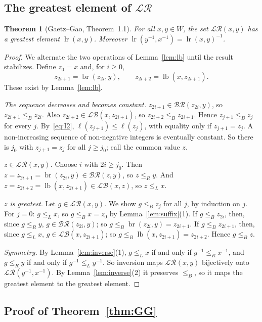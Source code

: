 \documentclass[11pt]{amsart}
\newtheorem{theorem}{Theorem}[section]
\theoremstyle{definition}
\theoremstyle{remark}
\numberwithin{equation}{section}
\newcommand{\LB}{\mathcal{LB}}
\newcommand{\BR}{\mathcal{BR}}
\newcommand{\LR}{\mathcal{LR}}
\newcommand{\leR}{\le_R}
\newcommand{\leL}{\le_L}
\newcommand{\leB}{\le_B}
\DeclareMathOperator{\lb}{lb}
\DeclareMathOperator{\br}{br}
\DeclareMathOperator{\lr}{lr}
\begin{document}
\subsection{The greatest element of \texorpdfstring{\(\LR\)}{LR}}

\begin{theorem}[Gaetz--Gao, Theorem~1.1]\label{thm:lr}
For all \(x,y\in W\), the set \(\LR(x,y)\) has a greatest element \(\lr(x,y)\). Moreover \(\lr(y^{-1},x^{-1})=\lr(x,y)^{-1}\).
\end{theorem}

\begin{proof}
We alternate the two operations of Lemma~\ref{lem:lb} until the result stabilizes. Define \(z_0=x\) and, for \(i\ge0\),
\[
z_{2i+1}=\br(z_{2i},y),\qquad z_{2i+2}=\lb(x,z_{2i+1}).
\]
These exist by Lemma~\ref{lem:lb}.

\emph{The sequence decreases and becomes constant.} \(z_{2i+1}\in\BR(z_{2i},y)\), so \(z_{2i+1}\leB z_{2i}\). Also \(z_{2i+2}\in\LB(x,z_{2i+1})\), so \(z_{2i+2}\leB z_{2i+1}\). Hence \(z_{j+1}\leB z_j\) for every \(j\). By~\eqref{eq:I2}, \(\ell(z_{j+1})\le\ell(z_j)\), with equality only if \(z_{j+1}=z_j\). A non-increasing sequence of non-negative integers is eventually constant. So there is \(j_0\) with \(z_{j+1}=z_j\) for all \(j\ge j_0\); call the common value \(z\).

\emph{\(z\in\LR(x,y)\).} Choose \(i\) with \(2i\ge j_0\). Then \(z=z_{2i+1}=\br(z_{2i},y)\in\BR(z,y)\), so \(z\leR y\). And \(z=z_{2i+2}=\lb(x,z_{2i+1})\in\LB(x,z)\), so \(z\leL x\).

\emph{\(z\) is greatest.} Let \(g\in\LR(x,y)\). We show \(g\leB z_j\) for all \(j\), by induction on \(j\). For \(j=0\): \(g\leL x\), so \(g\leB x=z_0\) by Lemma~\ref{lem:suffix}(1). If \(g\leB z_{2i}\), then, since \(g\leR y\), \(g\in\BR(z_{2i},y)\); so \(g\leB\br(z_{2i},y)=z_{2i+1}\). If \(g\leB z_{2i+1}\), then, since \(g\leL x\), \(g\in\LB(x,z_{2i+1})\); so \(g\leB\lb(x,z_{2i+1})=z_{2i+2}\). Hence \(g\leB z\).

\emph{Symmetry.} By Lemma~\ref{lem:inverse}(1), \(g\leL x\) if and only if \(g^{-1}\leR x^{-1}\), and \(g\leR y\) if and only if \(g^{-1}\leL y^{-1}\). So inversion maps \(\LR(x,y)\) bijectively onto \(\LR(y^{-1},x^{-1})\). By Lemma~\ref{lem:inverse}(2) it preserves \(\leB\), so it maps the greatest element to the greatest element.
\end{proof}

\subsection{Proof of Theorem~\ref{thm:GG}}
\end{document}

